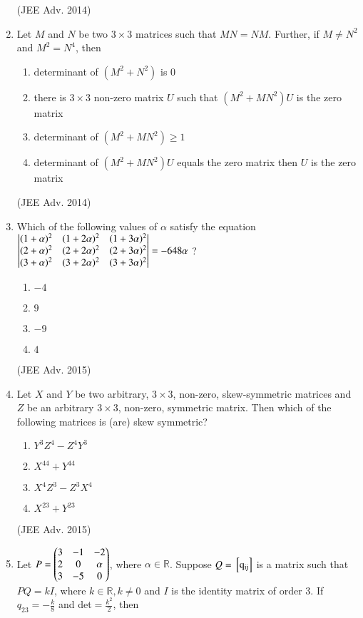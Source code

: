 \documentclass[journal,12pt,twocolumn]{IEEEtran}
\theoremstyle{remark}
\begin{document}
\begin{enumerate}
						\hfill (JEE Adv. 2014)
				\item
					Let $M$ and $N$ be two $3 \times 3$ matrices such that $MN=NM$. Further, if $M \neq N^2$ and $M^2 = N^4$, then
						\begin{enumerate}
							\item determinant of $(M^2 + N^2)$ is $0$
							\item there is $3 \times 3$ non-zero matrix $U$ such that $(M^2+MN^2)U$ is the zero matrix
							\item determinant of $(M^2 + MN^2) \geq 1$
							\item determinant of $(M^2 + MN^2)U$ equals the zero matrix then $U$ is the zero matrix
						\end{enumerate}
						\hfill (JEE Adv. 2014)
				\item
					Which of the following values of $\alpha$ satisfy the equation
						$\begin{vmatrix}
							(1 + \alpha)^2 & (1 + 2\alpha)^2 & (1+3\alpha)^2\\
							(2 + \alpha)^2 & (2 + 2\alpha)^2 & (2+3\alpha)^2\\
							(3 + \alpha)^2 & (3 + 2\alpha)^2 & (3+3\alpha)^2
						\end{vmatrix} = -648 \alpha $ ?
							\begin{enumerate}
								\item $-4$
								\item $9$
								\item $-9$
								\item $4$
							\end{enumerate}
							\hfill (JEE Adv. 2015)
				\item
					Let $X$ and $Y$ be two arbitrary, $3 \times 3$, non-zero, skew-symmetric matrices and $Z$ be an arbitrary $3 \times 3$, non-zero, symmetric matrix. Then which of the following matrices is (are) skew symmetric?
					\begin{enumerate}
						\item $Y^3Z^4 -Z^4Y^3$
						\item $X^{44} + Y^{44}$
						\item $X^4Z^3 -Z^3X^4$
						\item $X^{23} + Y^{23}$
					\end{enumerate}
					\hfill (JEE Adv. 2015)
				\item 
					Let $P = 
						\begin{pmatrix}		
							3 & -1 & -2\\
							2 & 0 & \alpha\\
							3 & -5 & 0
						\end{pmatrix}$,
					where $\alpha \in \mathbb{R}$. Suppose $Q= \mathrm{{}\left[q_{ij}\right]}$ is a matrix such that $PQ=kI$, where $k \in \mathbb{R}, k \neq 0$ and $I$ is the identity matrix of order $3$. If $q_{23} = -\frac{k}{8}$ and det$= \frac{k^2}{2}$, then

\end{enumerate}
\end{document}
